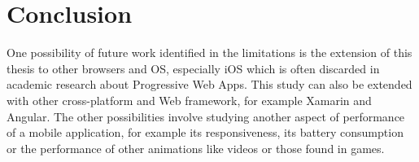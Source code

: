 \chapter{Conclusion}

One possibility of future work identified in the limitations is the extension of this thesis to other browsers and OS, especially iOS which is often discarded in academic research about Progressive Web Apps. This study can also be extended with other cross-platform and Web framework, for example Xamarin and Angular.\newline
The other possibilities involve studying another aspect of performance of a mobile application, for example its responsiveness, its battery consumption or the performance of other animations like videos or those found in games.
